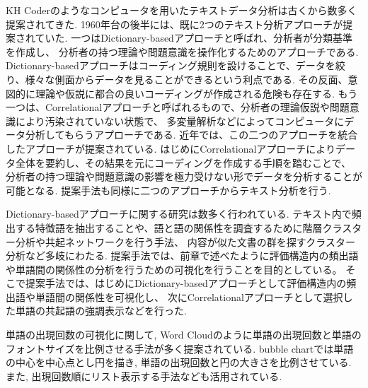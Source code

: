 \documentclass[syuuron]{kuee}
\begin{document}
		KH Coderのようなコンピュータを用いたテキストデータ分析は古くから数多く提案されてきた. 
		1960年台の後半には、既に2つのテキスト分析アプローチが提案されていた. 
		一つはDictionary-basedアプローチと呼ばれ、分析者が分類基準を作成し、
		分析者の持つ理論や問題意識を操作化するためのアプローチである. 
		Dictionary-basedアプローチはコーディング規則を設けることで、データを絞り、様々な側面からデータを見ることができるという利点である. 
		その反面、意図的に理論や仮説に都合の良いコーディングが作成される危険も存在する. 
		もう一つは、Correlationalアプローチと呼ばれるもので、分析者の理論仮説や問題意識により汚染されていない状態で、
		多変量解析などによってコンピュータにデータ分析してもらうアプローチである. 
		近年では、この二つのアプローチを統合したアプローチが提案されている\cite{kh1, kh2}. 
		はじめにCorrelationalアプローチによりデータ全体を要約し、その結果を元にコーディングを作成する手順を踏むことで、
		分析者の持つ理論や問題意識の影響を極力受けない形でデータを分析することが可能となる. 
		提案手法も同様に二つのアプローチからテキスト分析を行う. 
		
		Dictionary-basedアプローチに関する研究は数多く行われている. 
		テキスト内で頻出する特徴語を抽出することや、語と語の関係性を調査するために階層クラスター分析や共起ネットワークを行う手法、
		内容が似た文書の群を探すクラスター分析など多岐にわたる. 
		提案手法では、前章で述べたように評価構造内の頻出語や単語間の関係性の分析を行うための可視化を行うことを目的としている。
		そこで提案手法では、はじめにDictionary-basedアプローチとして評価構造内の頻出語や単語間の関係性を可視化し、
		次にCorrelationalアプローチとして選択した単語の共起語の強調表示などを行った. 
		
		単語の出現回数の可視化に関して, Word Cloudのように単語の出現回数と単語のフォントサイズを比例させる手法が多く提案されている\cite{wc1}. 
		bubble chartでは単語の中心を中心点とし円を描き, 単語の出現回数と円の大きさを比例させている. 
		また, 出現回数順にリスト表示する手法なども活用されている. 
		
\end{document}
